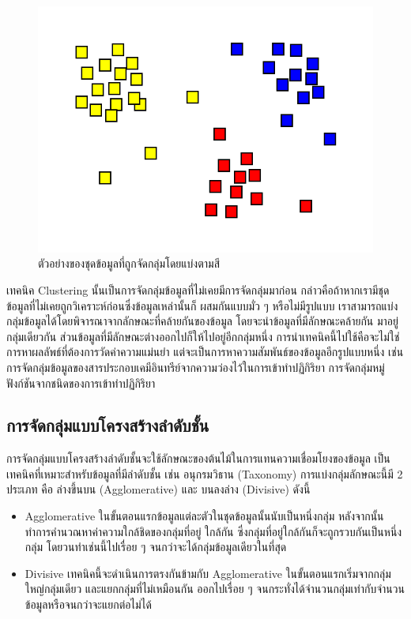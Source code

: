 \begin{figure}[htbp]
    \centering
    \includegraphics[width=0.8\linewidth]{fig/cluster.png}
    \caption{ตัวอย่างของชุดข้อมูลที่ถูกจัดกลุ่มโดยแบ่งตามสี}
    \label{fig:cluster}
\end{figure}

เทคนิค Clustering นั้นเป็นการจัดกลุ่มข้อมูลที่ไม่เคยมีการจัดกลุ่มมาก่อน กล่าวคือถ้าหากเรามีชุดข้อมูลที่ไม่เคยถูกวิเคราะห์ก่อนซึ่งข้อมูลเหล่านั้นก็%
ผสมกันแบบมั่ว ๆ หรือไม่มีรูปแบบ เราสามารถแบ่งกลุ่มข้อมูลได้โดยพิจารณาจากลักษณะที่คล้ายกันของข้อมูล โดยจะนำข้อมูลที่มีลักษณะคล้ายกัน%
มาอยู่กลุ่มเดียวกัน ส่วนข้อมูลที่มีลักษณะต่างออกไปก็ให้ไปอยู่อีกกลุ่มหนึ่ง การนำเทคนิคนี้ไปใช้คือจะไม่ใช่การหาผลลัพธ์ที่ต้องการวัดค่าความแม่นยำ 
แต่จะเป็นการหาความสัมพันธ์ของข้อมูลอีกรูปแบบหนึ่ง เช่น การจัดกลุ่มข้อมูลของสารประกอบเคมีอินทรีย์จากความว่องไว้ในการเข้าทำปฏิกิริยา 
การจัดกลุ่มหมู่ฟังก์ชันจากชนิดของการเข้าทำปฏิกิริยา

\subsection{การจัดกลุ่มแบบโครงสร้างลำดับชั้น}
\label{ssec:hierar_clustering}

การจัดกลุ่มแบบโครงสร้างลำดับชั้นจะใช้ลักษณะของต้นไม้ในการแทนความเชื่อมโยงของข้อมูล เป็นเทคนิคที่เหมาะสำหรับข้อมูลที่มีลำดับชั้น เช่น 
อนุกรมวิธาน (Taxonomy) การแบ่งกลุ่มลักษณะนี้มี 2 ประเภท คือ ล่างขึ้นบน (Agglomerative) และ บนลงล่าง (Divisive) ดังนี้ 

\begin{itemize}
    \item Agglomerative ในขั้นตอนแรกข้อมูลแต่ละตัวในชุดข้อมูลนั้นนับเป็นหนึ่งกลุ่ม หลังจากนั้นทำการคำนวณหาค่าความใกล้ชิดของกลุ่มที่อยู่%
    ใกล้กัน ซึ่งกลุ่มที่อยู่ใกล้กันก็จะถูกรวบกันเป็นหนึ่งกลุ่ม โดยวนทำเช่นนี้ไปเรื่อย ๆ จนกว่าจะได้กลุ่มข้อมูลเดียวในที่สุด
    
    \item Divisive เทคนิคนี้จะดำเนินการตรงกันข้ามกับ Agglomerative ในขั้นตอนแรกเริ่มจากกลุ่มใหญ่กลุ่มเดียว และแยกกลุ่มที่ไม่เหมือนกัน%
    ออกไปเรื่อย ๆ จนกระทั่งได้จำนวนกลุ่มเท่ากับจำนวนข้อมูลหรือจนกว่าจะแยกต่อไม่ได้ 
\end{itemize}

